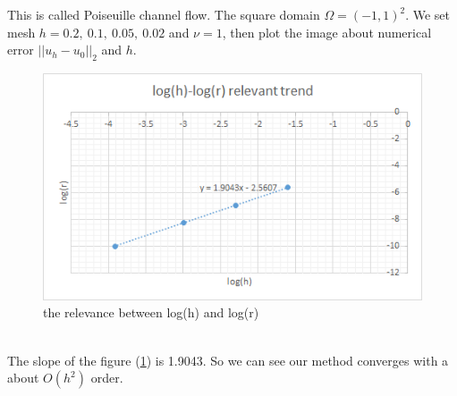 \documentclass[a4paper]{article}
\begin{document}
This is called Poiseuille channel flow. The square domain $\Omega = (-1,1)^2$. We set mesh $h=0.2,\ 0.1,\ 0.05,\ 0.02$ and $\nu=1$, then plot the image about numerical error $||u_h-u_0||_2$ and $h$.
\begin{figure}[h]
\centering
\includegraphics[scale = 0.8]{convergence.png}
\caption{the relevance between log(h) and log(r)}
\label{im::log(h)-res}
\end{figure}
\\
The slope of the figure (\ref{im::log(h)-res}) is 1.9043. So we can see our method converges with a about $O(h^2)$ order. \\
\\
\end{document}
